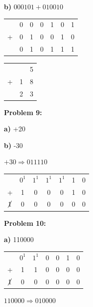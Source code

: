 \documentclass{article}
\begin{document}
    \quad \textbf{b)} $000101 + 010010$

    \begin{center}
        \begin{tabular}{ ccccccc }
              & 0 & 0 & 0 & 1 & 0 & 1 \\
            + & 0 & 1 & 0 & 0 & 1 & 0 \\
            \hline
            & 0 & 1 & 0 & 1 & 1 & 1
        \end{tabular}
        \quad\quad 
        \begin{tabular}{ ccc }
            & & 5 \\
            + & 1 & 8 \\
            \hline
            & 2 & 3
        \end{tabular}
    \end{center}

    \textbf{Problem 9:}

    \quad \textbf{a)} +20

    \quad\quad {}

    \quad \textbf{b)} -30

    \quad\quad $+30 \Rightarrow 011110$

    \begin{center}
        \begin{tabular}{ ccccccc }
              & $0^1$ & $1^1$ & $1^1$ & $1^1$ & 1 & 0 \\
            + & 1 & 0 & 0 & 0 & 1 & 0  \\
            \hline
            $\cancel{1}$ & 0 & 0 & 0 & 0 & 0 & 0 
        \end{tabular}
    \end{center}

    \quad\quad {}

    \textbf{Problem 10:}

    \quad \textbf{a)} 110000

    \begin{center}
        \begin{tabular}{ ccccccc }
              & $0^1$ & $1^1$ & 0 & 0 & 1 & 0 \\
            + & 1 & 1 & 0 & 0 & 0 & 0  \\
            \hline
            $\cancel{1}$ & 0 & 0 & 0 & 0 & 0 & 0 
        \end{tabular}
    \end{center}

    \quad\quad $110000 \Rightarrow 010000$
\end{document}
